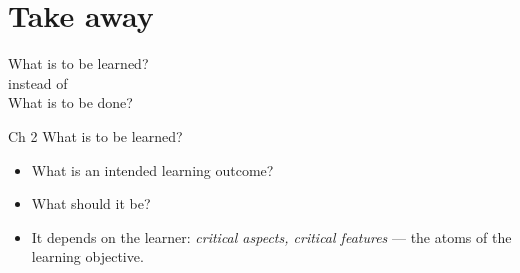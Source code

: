 \section{Take away}

\begin{frame}
  \begin{center}
    What is to be learned?\\[1em]
    instead of\\[1em]
    What is to be done?
  \end{center}
\end{frame}

\begin{frame}
  \begin{block}{Ch 2 What is to be learned?}
    \begin{itemize}
      \item What is an intended learning outcome?
      \item What should it be?
      \item It depends on the learner: \emph{critical aspects, critical 
        features} --- the atoms of the learning objective.
    \end{itemize}
  \end{block}
\end{frame}
